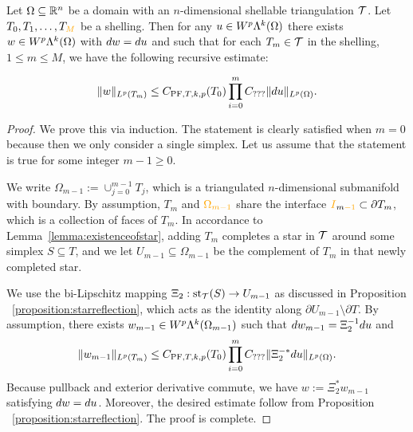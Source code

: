 \documentclass[10pt,letterpaper]{article}
\newcommand\cye[1]{%
  \protect\leavevmode
  \begingroup
    \color{red!35!yellow}%
    #1%
  \endgroup
}
\begin{document}


\begin{theorem}\label{theorem:poincarefriedrichsestimate:exterior:contraction}
    Let $\Omega \subseteq {\mathbb R}^{n}$ be a domain with an \cye{$n$-dimensional} shellable triangulation ${\mathcal T}$.
    Let $T_0, T_1, \dots, T_{\cye{M}}$ be a shelling.
    Then for any $u \in W^{p}\Lambda^{k}(\Omega)$ 
    there exists $w \in W^{p}\Lambda^{k}(\Omega)$ with $d w = d u$ 
    and such that \cye{for each $T_{m} \in {\mathcal T}$ in the shelling, $1 \leq m \leq M$,
    we have the following recursive estimate:} 
    \begin{align*}
        \| w \|_{L^{p}(T_{m})}
        \leq 
        C_{{\rm PF},T,k,p}(T_{0})
        \prod_{i=0}^{m} 
        C_{???}
        \| d u \|_{L^{p}(\Omega)}
        .
    \end{align*}
\end{theorem}
\begin{proof}
    We prove this via induction. 
    The statement is clearly satisfied when $m=0$ because then we only consider a single simplex. 
    Let us assume that the statement is true for some integer $m-1 \geq 0$.
    
    We write $\Omega_{m-1} := \cup_{j=0}^{m-1} T_{j}$, 
    which is a triangulated $n$-dimensional submanifold with boundary.
    By assumption, $T_{m}$ and $\cye{\Omega_{m-1}}$ share the interface $\cye{I}_{m\cye{-1}} \subset \partial T_{m}$, 
    which is a collection of faces of $T_{m}$. 
    In accordance to Lemma~\ref{lemma:existenceofstar}, adding $T_{m}$ completes a star in ${\mathcal T}$ around some simplex $S \subseteq T$, 
    and we let $U_{m-1} \subseteq \Omega_{m-1}$ be the complement of $T_{m}$ in that newly completed star. 
    
    We use the bi-Lipschitz mapping $\Xi_{2} : \operatorname{st}_{{\mathcal T}}(S) \rightarrow U_{m-1}$ as discussed in \cye{Proposition}~\ref{proposition:starreflection},
    which acts as the identity along $\partial U_{m-1} \setminus \partial T$.
    By assumption, 
    there exists $w_{m-1} \in W^{p}\Lambda^{k}(\Omega_{m-1})$ 
    such that $d w_{m-1} = \Xi_{2}^{-1} d u$ and 
    \begin{align*}
        \| w_{m-1} \|_{L^{p}(T_{m})}
        \leq 
        C_{{\rm PF},T,k,p}(T_{0})
        \prod_{i=0}^{m} 
        C_{???}
        \| \Xi_{2}^{-\ast} d u \|_{L^{p}(\Omega)}
        .
    \end{align*}
    Because pullback and exterior derivative commute, 
    we have $w := \Xi_{2}^{\ast} w_{m-1}$ satisfying $d w = d u$. 
    Moreover, the desired estimate follow from \cye{Proposition}~\ref{proposition:starreflection}.
    The proof is complete. 
\end{proof}
\end{document}
